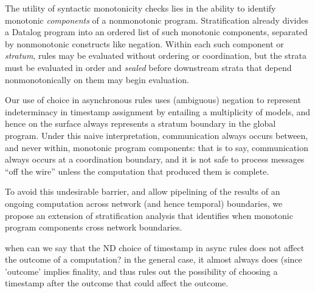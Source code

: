 The utility of syntactic monotonicity checks lies in the ability to identify monotonic 
\emph{components} of a nonmonotonic program.  Stratification already divides
a Datalog program into an ordered list of such monotonic components, separated by 
nonmonotonic constructs like negation.  Within each such component or \emph{stratum}, rules
may be evaluated without ordering or coordination, but the strata must be evaluated in order and 
\emph{sealed} before downstream strata that depend nonmonotonically on them may 
begin evaluation.  

Our use of choice in asynchronous rules uses (ambiguous) negation to represent indeterminacy
in timestamp assignment by entailing a multiplicity of models, and hence on the surface
always represents a stratum boundary in the global
program.  Under this naive interpretation, communication always occurs between, and never
within, monotonic program components: that is to say, communication always occurs at a 
coordination boundary, and it is not safe to process messages ``off the wire'' unless the 
computation that produced them is complete.  

To avoid this undesirable barrier, and allow 
pipelining of the results of an ongoing computation across network (and hence temporal)
boundaries, we propose an extension of stratification analysis that identifies when 
monotonic program components cross network boundaries. 





when can we say that the ND choice of timestamp in async rules does not affect the outcome
of a computation?  in the general case, it almost always does (since 'outcome' implies finality,
and thus rules out the possibility of choosing a timestamp after the outcome that could affect the outcome.

